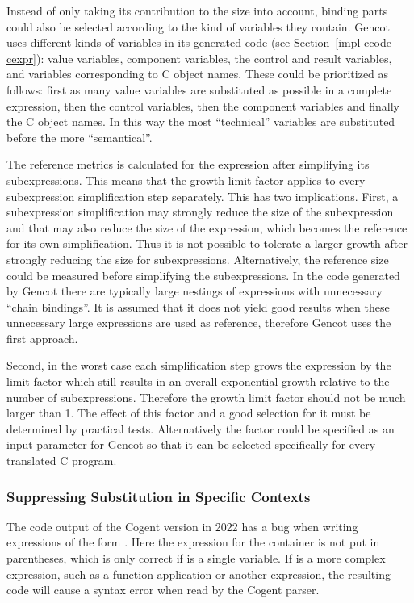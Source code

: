 Instead of only taking its contribution to the size into account, binding parts could also be selected according to the kind of
variables they contain. 
Gencot uses different kinds of variables in its generated code (see Section~\ref{impl-ccode-cexpr}): value variables, component
variables, the control and result variables, and variables corresponding to C object names. These could be prioritized
as follows: first as many value 
variables are substituted as possible in a complete expression, then the control variables, then the component variables and
finally the C object names. In this way the most ``technical'' variables are substituted before the more ``semantical''.

The reference metrics is calculated for the expression after simplifying its subexpressions. This means that the growth limit factor
applies to every subexpression simplification step separately. This has two implications. First, a subexpression simplification
may strongly reduce the size of the subexpression and that may also reduce the size of the  expression, which becomes 
the reference for its own simplification. Thus it is not possible to tolerate a larger growth after strongly reducing the size for
subexpressions. Alternatively, the reference size could be measured before simplifying the subexpressions. In the code generated
by Gencot there are typically large nestings of  expressions with unnecessary ``chain bindings''. It is assumed that it
does not yield good results when these unnecessary large expressions are used as reference, therefore Gencot uses the first approach.

Second, in the worst case each simplification step grows the expression by the limit factor which still results in an overall exponential growth
relative to the number of subexpressions. Therefore the growth limit factor should not be much larger than 1. The effect of this
factor and a good selection for it must be determined by practical tests. Alternatively the factor could be specified as an input 
parameter for Gencot so that it can be selected specifically for every translated C program.

\subsubsection{Suppressing Substitution in Specific Contexts}

The code output of the Cogent version in 2022 has a bug when writing  expressions of the form . Here the
expression  for the container is not put in parentheses, which is only correct if  is a single variable. If
 is a more complex expression, such as a function application or another  expression, the resulting code will
cause a syntax error when read by the Cogent parser.

